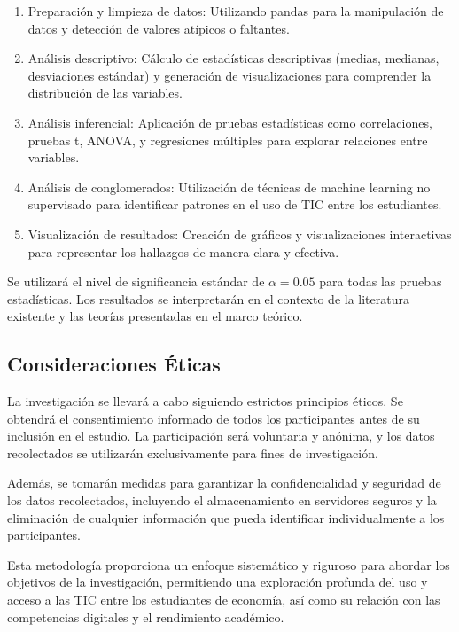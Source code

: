\documentclass[12pt, a4paper]{article}
\begin{document}
\begin{enumerate}
    \item Preparación y limpieza de datos: Utilizando pandas para la manipulación de datos y detección de valores atípicos o faltantes.
    \item Análisis descriptivo: Cálculo de estadísticas descriptivas (medias, medianas, desviaciones estándar) y generación de visualizaciones para comprender la distribución de las variables.
    \item Análisis inferencial: Aplicación de pruebas estadísticas como correlaciones, pruebas t, ANOVA, y regresiones múltiples para explorar relaciones entre variables.
    \item Análisis de conglomerados: Utilización de técnicas de machine learning no supervisado para identificar patrones en el uso de TIC entre los estudiantes.
    \item Visualización de resultados: Creación de gráficos y visualizaciones interactivas para representar los hallazgos de manera clara y efectiva.
\end{enumerate}

Se utilizará el nivel de significancia estándar de $\alpha = 0.05$ para todas las pruebas estadísticas. Los resultados se interpretarán en el contexto de la literatura existente y las teorías presentadas en el marco teórico.

\subsection{Consideraciones Éticas}

La investigación se llevará a cabo siguiendo estrictos principios éticos. Se obtendrá el consentimiento informado de todos los participantes antes de su inclusión en el estudio. La participación será voluntaria y anónima, y los datos recolectados se utilizarán exclusivamente para fines de investigación. 

Además, se tomarán medidas para garantizar la confidencialidad y seguridad de los datos recolectados, incluyendo el almacenamiento en servidores seguros y la eliminación de cualquier información que pueda identificar individualmente a los participantes.

Esta metodología proporciona un enfoque sistemático y riguroso para abordar los objetivos de la investigación, permitiendo una exploración profunda del uso y acceso a las TIC entre los estudiantes de economía, así como su relación con las competencias digitales y el rendimiento académico.


\newpage
\end{document}
